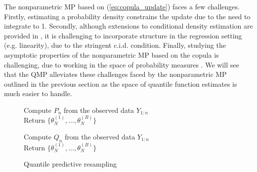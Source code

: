 \documentclass[11pt,a4paper]{article}
\begin{document}
The nonparametric MP based on (\ref{eq:copula_update}) faces a few challenges. 
Firstly, estimating a probability density constrains the update due to the need to integrate to 1.
Secondly, although extensions to conditional density estimation are provided in \cite{Fong2023a}, it is challenging to incorporate structure in the regression setting (e.g. linearity), due to the stringent c.i.d. condition. Finally, studying the asymptotic properties of the nonparametric MP based on the copula is challenging, due to working in the space of probability measures \citep{Berti2004}. We will see that the QMP alleviates these challenges faced by the nonparametric MP outlined in the previous section as the space of quantile function estimates is much easier to handle.\vspace{2mm}

\begin{figure}[ht]
\small
  \centering
  \begin{minipage}{.44\linewidth}
\begin{algorithm}[H]
{Compute $P_n$ from the observed data $Y_{1:n}$}\\
 {Return $\{\theta_N^{(1)},\ldots,\theta_N^{(B)} \}$}
\caption{Predictive resampling}\label{alg:predictive_resampling}
\end{algorithm}
  \end{minipage}\hspace{2mm}
    \begin{minipage}{.54\linewidth}
\begin{algorithm}[H]
{Compute $Q_n$ from the observed data $Y_{1:n}$}\\
 {Return $\{\theta_N^{(1)},\ldots,\theta_N^{(B)} \}$}
\caption{Quantile predictive resampling}\label{alg:quantile_predictive_resampling}
\end{algorithm}
  \end{minipage}
\end{figure}
\end{document}
